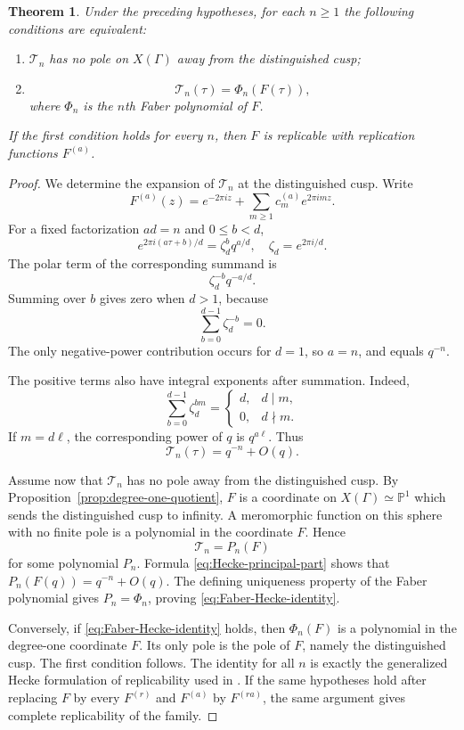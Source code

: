 \documentclass[11pt]{amsart}
\newtheorem{thm}{Theorem}[section]
\theoremstyle{definition}
\theoremstyle{remark}
\numberwithin{equation}{section}
\begin{document}
\begin{thm}\label{thm:degree-one-replication}
Under the preceding hypotheses, for each $n\geq1$ the following conditions are equivalent:
\begin{enumerate}
\item $\mathcal T_n$ has no pole on $X(\Gamma)$ away from the distinguished cusp;
\item
\begin{equation}\label{eq:Faber-Hecke-identity}
\mathcal T_n(\tau)=\Phi_n(F(\tau)),
\end{equation}
where $\Phi_n$ is the $n$th Faber polynomial of $F$.
\end{enumerate}
If the first condition holds for every $n$, then $F$ is replicable with replication functions $F^{(a)}$.
\end{thm}

\begin{proof}
We determine the expansion of $\mathcal T_n$ at the distinguished cusp. Write
\[
F^{(a)}(z)=e^{-2\pi iz}+\sum_{m\geq1}c_m^{(a)}e^{2\pi imz}.
\]
For a fixed factorization $ad=n$ and $0\leq b<d$,
\[
e^{2\pi i(a\tau+b)/d}=\zeta_d^b q^{a/d},
\quad \zeta_d=e^{2\pi i/d}.
\]
The polar term of the corresponding summand is
\[
\zeta_d^{-b}q^{-a/d}.
\]
Summing over $b$ gives zero when $d>1$, because
\[
\sum_{b=0}^{d-1}\zeta_d^{-b}=0.
\]
The only negative-power contribution occurs for $d=1$, so $a=n$, and equals $q^{-n}$.

The positive terms also have integral exponents after summation. Indeed,
\[
\sum_{b=0}^{d-1}\zeta_d^{bm}
=
\begin{cases}
d,&d\mid m,\\
0,&d\nmid m.
\end{cases}
\]
If $m=d\ell$, the corresponding power of $q$ is $q^{a\ell}$. Thus
\begin{equation}\label{eq:Hecke-principal-part}
\mathcal T_n(\tau)=q^{-n}+O(q).
\end{equation}

Assume now that $\mathcal T_n$ has no pole away from the distinguished cusp. By Proposition~\ref{prop:degree-one-quotient}, $F$ is a coordinate on $X(\Gamma)\simeq\mathbb P^1$ which sends the distinguished cusp to infinity. A meromorphic function on this sphere with no finite pole is a polynomial in the coordinate $F$. Hence
\[
\mathcal T_n=P_n(F)
\]
for some polynomial $P_n$. Formula \eqref{eq:Hecke-principal-part} shows that $P_n(F(q))=q^{-n}+O(q)$. The defining uniqueness property of the Faber polynomial gives $P_n=\Phi_n$, proving \eqref{eq:Faber-Hecke-identity}.

Conversely, if \eqref{eq:Faber-Hecke-identity} holds, then $\Phi_n(F)$ is a polynomial in the degree-one coordinate $F$. Its only pole is the pole of $F$, namely the distinguished cusp. The first condition follows. The identity for all $n$ is exactly the generalized Hecke formulation of replicability used in \cite{cummins-norton,mckay-sebbar-replicable}. If the same hypotheses hold after replacing $F$ by every $F^{(r)}$ and $F^{(a)}$ by $F^{(ra)}$, the same argument gives complete replicability of the family.
\end{proof}
\end{document}
